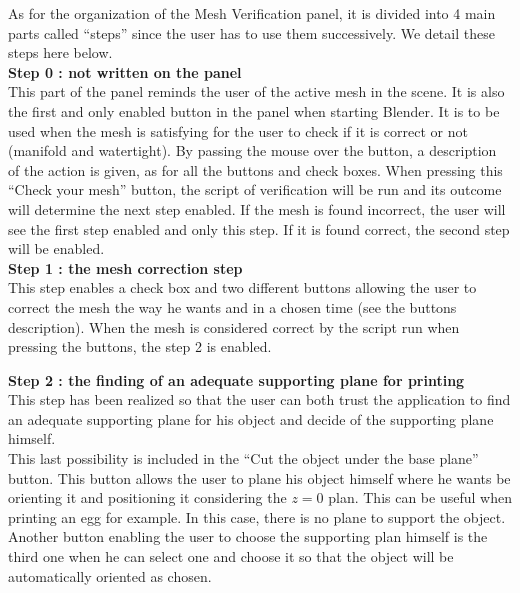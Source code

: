 \documentclass{article}
\begin{document}
As for the organization of the Mesh Verification panel, it is divided into 4 main parts called ``steps'' since the user has to use them successively. We detail these steps here below.\\

\textbf{Step 0 : not written on the panel} \\

This part of the panel reminds the user of the active mesh in the scene. It is also the first and only enabled button in the panel when starting Blender. It is to be used when the mesh is satisfying for the user to check if it is correct or not (manifold and watertight). By passing the mouse over the button, a description of the action is given, as for all the buttons and check boxes. When pressing this ``Check your mesh'' button, the script of verification will be run and its outcome will determine the next step enabled. If the mesh is found incorrect, the user will see the first step enabled and only this step. If it is found correct, the second step will be enabled.\\

\textbf{Step 1 : the mesh correction step} \\

This step enables a check box and two different buttons allowing the user to correct the mesh the way he wants and in a chosen time (see the buttons description). When the mesh is considered correct by the script run when pressing the buttons, the step 2 is enabled. 

\newpage

\textbf{Step 2 : the finding of an adequate supporting plane for printing}\\

This step has been realized so that the user can both trust the application to find an adequate supporting plane for his object and decide of the supporting plane himself. \\

This last possibility is included in the ``Cut the object under the base plane'' button. This button allows the user to plane his object himself where he wants be orienting it and positioning it considering the $z = 0$ plan. This can be useful when printing an egg for example. In this case, there is no plane to support the object. Another button enabling the user to choose the supporting plan himself is the third one when he can select one and choose it so that the object will be automatically oriented as chosen.\\
\end{document}
